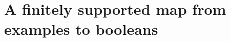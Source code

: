 \documentclass[runningheads]{llncs}
\newcommand\strong[1]{{\bfseries#1}}
\newcommand\todo[1]{{\color{IndianRed}#1}}
\newcommand\xxx{\text{\todo{\strong{XXX}}}}
\renewcommand\todo[1]{\ignorespaces}\renewcommand\xxx{\text{\color{IndianRed}\strong{XXX}}}
\newcommand\catname[1]{\ensuremath{\mathrm{#1}}}
\newcommand\Point{\ensuremath{\catname{Set}_{*}}}
\newcommand\name[1]{\ensuremath{\mathit{#1}}}
\newcommand\<\:                 %
\newcommand\fto\Rightarrow
\newcommand\kword[1]{\ensuremath{\textrm{#1}}}
\newcommand\nil{\name{nil}}
\begin{document}





\section{A finitely supported map from examples to booleans}
\end{document}
